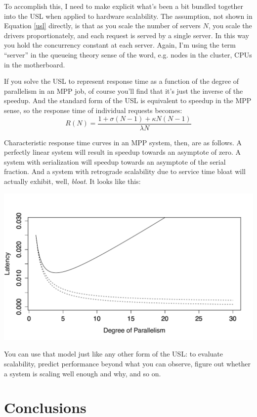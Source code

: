 \documentclass{vivid_layout}
\begin{document}
To accomplish this, I need to make explicit what's been a bit bundled together
into the USL when applied to hardware scalability. The assumption, not shown in
Equation \ref{usl} directly, is that as you scale the number of servers $N$, you
scale the drivers proportionately, and each request is served by a single
server. In this way you hold the concurrency constant at each server. Again, I'm
using the term ``server'' in the queueing theory sense of the word, e.g. nodes
in the cluster, CPUs in the motherboard.

If you solve the USL to represent response time as a function of the degree of
parallelism in an MPP job, of course you'll find that it's just the inverse of
the speedup. And the standard form of the USL is equivalent to speedup in the
MPP sense, so the response time of individual requests becomes:
\begin{equation}
R(N) = \frac{1 + \sigma (N-1) + \kappa N (N-1)}{\lambda N}
\label{usl_speedup}
\end{equation}

Characteristic response time curves in an MPP system, then, are as follows. A
perfectly linear system will result in speedup towards an asymptote of zero. A
system with serialization will speedup towards an asymptote of the serial
fraction. And a system with retrograde scalability due to service time bloat
will actually exhibit, well, {\itshape bloat}. It looks like this:
\begin{center}
\includegraphics[width=.85\linewidth]{scalability/mpp-speedup}
\end{center}

You can use that model just like any other form of the USL: to evaluate
scalability, predict performance beyond what you can observe, figure out whether
a system is scaling well enough and why, and so on.

\section{Conclusions}
\end{document}
